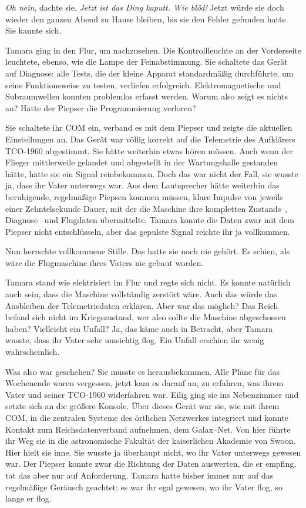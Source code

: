 \emph{Oh nein}, dachte sie, \emph{Jetzt ist das Ding kaputt. Wie blöd!} Jetzt würde sie doch wieder den ganzen Abend zu Hause bleiben, bis sie den Fehler gefunden hatte. Sie kannte sich. 

Tamara ging in den Flur, um nachzusehen. Die Kontrollleuchte an der Vorderseite leuchtete, ebenso, wie die Lampe der Feinabstimmung. Sie schaltete das Gerät auf Diagnose: alle Tests, die der kleine Apparat standardmäßig durchführte, um seine Funktionsweise zu testen, verliefen erfolgreich. Elektromagnetische und Subraumwellen konnten problemlos erfasst werden. Warum also zeigt es nichts an? Hatte der Piepser die Programmierung verloren?

Sie schaltete ihr COM ein, verband es mit dem Piepser und zeigte die aktuellen Einstellungen an. Das Gerät war völlig korrekt auf die Telemetrie des Aufklärers \textsf{TCO-1960} abgestimmt. Sie hätte weiterhin etwas hören müssen. Auch wenn der Flieger mittlerweile gelandet und abgestellt in der Wartungshalle gestanden hätte, hätte sie ein Signal reinbekommen. Doch das war nicht der Fall, sie wusste ja, dass ihr Vater unterwegs war. Aus dem Lautsprecher hätte weiterhin das beruhigende, regelmäßige Piepsen kommen müssen, klare Impulse von jeweils einer Zehntelsekunde Dauer, mit der die Maschine ihre kompletten Zustands--, Diagnose-- und Flugdaten übermittelte. Tamara konnte die Daten zwar mit dem Piepser nicht entschlüsseln, aber das gepulste Signal reichte ihr ja vollkommen.

Nun herrschte vollkommene Stille. Das hatte sie noch nie gehört. Es schien, als wäre die Flugmaschine ihres Vaters nie gebaut worden.

Tamara stand wie elektrisiert im Flur und regte sich nicht. Es konnte natürlich auch sein, dass die Maschine vollständig zerstört wäre. Auch das würde das  Ausbleiben der Telemetriedaten erklären. Aber war das möglich? Das Reich befand sich nicht im Kriegszustand, wer also sollte die Maschine abgeschossen haben? Vielleicht ein Unfall? Ja, das käme auch in Betracht, aber Tamara wusste, dass ihr Vater sehr umsichtig flog. Ein Unfall erschien ihr wenig wahrscheinlich.

Was also war geschehen? Sie musste es herausbekommen. Alle Pläne für das Wochenende waren vergessen, jetzt kam es darauf an, zu erfahren, was ihrem Vater und seiner \textsf{TCO-1960} widerfahren war. Eilig ging sie ins Nebenzimmer und setzte sich an die größere Konsole. Über dieses Gerät war sie, wie mit ihrem COM, in die zentralen Systeme des örtlichen Netzwerkes integriert und konnte Kontakt zum Reichsdatenverband aufnehmen, dem Galax--Net. Von hier führte ihr Weg sie in die astronomische Fakultät der kaiserlichen Akademie von Swoon. Hier hielt sie inne. Sie wusste ja überhaupt nicht, wo ihr Vater unterwegs gewesen war. Der Piepser konnte zwar die Richtung der Daten auswerten, die er empfing, tat das aber nur auf Anforderung. Tamara hatte bisher immer nur auf das regelmäßige Geräusch geachtet; es war ihr egal gewesen, wo ihr Vater flog, so lange er flog.

